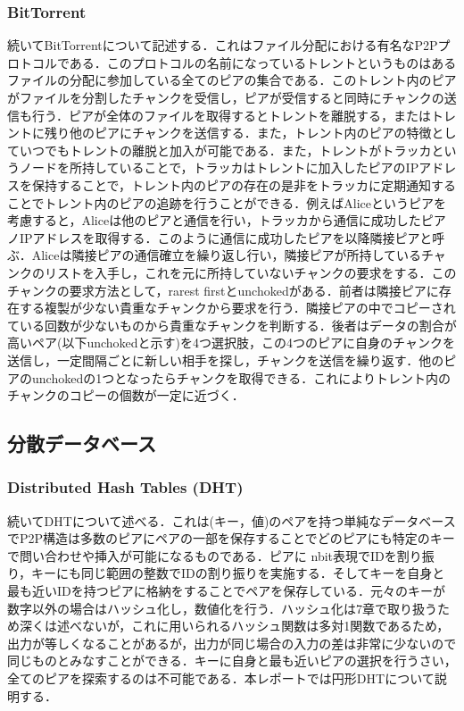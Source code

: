 \documentclass[9pt,a4j,twocolumn]{jsarticle}
\begin{document}
\subsubsection{BitTorrent}
続いてBitTorrentについて記述する．これはファイル分配における有名なP2Pプロトコルである．このプロトコルの名前になっているトレントというものはあるファイルの分配に参加している全てのピアの集合である．このトレント内のピアがファイルを分割したチャンクを受信し，ピアが受信すると同時にチャンクの送信も行う．ピアが全体のファイルを取得するとトレントを離脱する，またはトレントに残り他のピアにチャンクを送信する．また，トレント内のピアの特徴としていつでもトレントの離脱と加入が可能である．また，トレントがトラッカというノードを所持していることで，トラッカはトレントに加入したピアのIPアドレスを保持することで，トレント内のピアの存在の是非をトラッカに定期通知することでトレント内のピアの追跡を行うことができる．例えばAliceというピアを考慮すると，Aliceは他のピアと通信を行い，トラッカから通信に成功したピアノIPアドレスを取得する．このように通信に成功したピアを以降隣接ピアと呼ぶ．Aliceは隣接ピアの通信確立を繰り返し行い，隣接ピアが所持しているチャンクのリストを入手し，これを元に所持していないチャンクの要求をする．このチャンクの要求方法として，rarest firstとunchokedがある．前者は隣接ピアに存在する複製が少ない貴重なチャンクから要求を行う．隣接ピアの中でコピーされている回数が少ないものから貴重なチャンクを判断する．後者はデータの割合が高いペア(以下unchokedと示す)を4つ選択肢，この4つのピアに自身のチャンクを送信し，一定間隔ごとに新しい相手を探し，チャンクを送信を繰り返す．他のピアのunchokedの1つとなったらチャンクを取得できる．これによりトレント内のチャンクのコピーの個数が一定に近づく．
\\
\subsection{分散データベース}
\subsubsection{Distributed Hash Tables (DHT)}
続いてDHTについて述べる．これは(キー，値)のペアを持つ単純なデータベースでP2P構造は多数のピアにペアの一部を保存することでどのピアにも特定のキーで問い合わせや挿入が可能になるものである．ピアに
nbit表現でIDを割り振り，キーにも同じ範囲の整数でIDの割り振りを実施する．そしてキーを自身と最も近いIDを持つピアに格納をすることでペアを保存している．元々のキーが数字以外の場合はハッシュ化し，数値化を行う．ハッシュ化は7章で取り扱うため深くは述べないが，これに用いられるハッシュ関数は多対1関数であるため，出力が等しくなることがあるが，出力が同じ場合の入力の差は非常に少ないので同じものとみなすことができる．キーに自身と最も近いピアの選択を行うさい，全てのピアを探索するのは不可能である．本レポートでは円形DHTについて説明する．
\\
\end{document}
